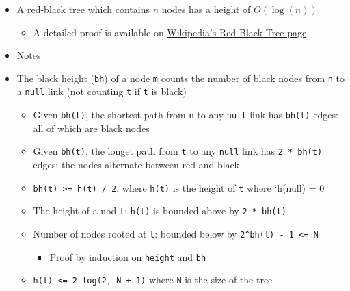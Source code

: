 \documentclass[
  10pt,
  english,
  letterpaper,
,tablecaptionabove
]{scrartcl}
\newcommand{\passthrough}[1]{#1}
\providecommand{\tightlist}{%
  \setlength{\itemsep}{0pt}\setlength{\parskip}{0pt}}
\begin{document}
\begin{itemize}
\tightlist
\item
  A red-black tree which contains \(n\) nodes has a height of
  \(O(\log(n))\)

  \begin{itemize}
  \tightlist
  \item
    A detailed proof is available on
    \href{http://en.wikipedia.org/wiki/Red\%E2\%80\%93black_tree}{Wikipedia's
    Red-Black Tree page}
  \end{itemize}
\item
  Notes
\item
  The black height (\passthrough{\lstinline!bh!}) of a node
  \passthrough{\lstinline!m!} counts the number of black nodes from
  \passthrough{\lstinline!n!} to a \passthrough{\lstinline!null!} link
  (not counting \passthrough{\lstinline!t!} if
  \passthrough{\lstinline!t!} is black)

  \begin{itemize}
  \tightlist
  \item
    Given \passthrough{\lstinline!bh(t)!}, the shortest path from
    \passthrough{\lstinline!n!} to any \passthrough{\lstinline!null!}
    link has \passthrough{\lstinline!bh(t)!} edges: all of which are
    black nodes
  \item
    Given \passthrough{\lstinline!bh(t)!}, the longet path from
    \passthrough{\lstinline!t!} to any \passthrough{\lstinline!null!}
    link has \passthrough{\lstinline!2 * bh(t)!} edges: the nodes
    alternate between red and black
  \item
    \passthrough{\lstinline!bh(t) >= h(t) / 2!}, where
    \passthrough{\lstinline!h(t)!} is the height of
    \passthrough{\lstinline!t!} where `h(null) = 0
  \item
    The height of a nod \passthrough{\lstinline!t!}:
    \passthrough{\lstinline!h(t)!} is bounded above by
    \passthrough{\lstinline!2 * bh(t)!}
  \item
    Number of nodes rooted at \passthrough{\lstinline!t!}: bounded below
    by \passthrough{\lstinline!2^bh(t) - 1 <= N!}

    \begin{itemize}
    \tightlist
    \item
      Proof by induction on \passthrough{\lstinline!height!} and
      \passthrough{\lstinline!bh!}
    \end{itemize}
  \item
    \passthrough{\lstinline!h(t) <= 2 log(2, N + 1)!} where
    \passthrough{\lstinline!N!} is the size of the tree
  \end{itemize}
\end{itemize}
\end{document}
